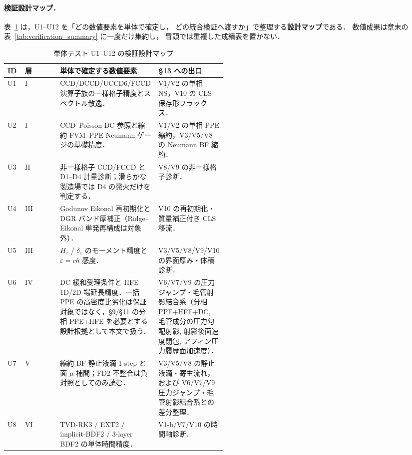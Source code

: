 \paragraph{検証設計マップ．}
表~\ref{tab:U_summary} は，U1--U12 を「どの数値要素を単体で確定し，
どの統合検証へ渡すか」で整理する\textbf{設計マップ}である．
数値成果は章末の表~\ref{tab:verification_summary} に一度だけ集約し，
冒頭では重複した成績表を置かない．

\begin{table}[!ht]
\caption{単体テスト U1--U12 の検証設計マップ}
\label{tab:U_summary}
\centering
\PaperTableDenseSetup
\begin{tabularx}{\linewidth}{@{}>{\raggedright\arraybackslash}p{0.08\linewidth}>{\raggedright\arraybackslash}p{0.16\linewidth}>{\raggedright\arraybackslash}X>{\raggedright\arraybackslash}p{0.27\linewidth}@{}}
\toprule
ID & 層 & 単体で確定する数値要素 & §13 への出口 \\
\midrule
U1 & I & CCD/DCCD/UCCD6/FCCD 演算子族の一様格子精度とスペクトル散逸． & V1/V2 の単相 NS，V10 の CLS 保存形フラックス． \\
U2 & I & CCD--Poisson DC 参照と縮約 FVM--PPE Neumann ゲージの基礎精度． & V1/V2 の単相 PPE 縮約，V3/V5/V8 の Neumann BF 縮約． \\
U3 & II & 非一様格子 CCD/FCCD と D1--D4 計量診断；滑らかな製造場では D4 の発火だけを判定する． & V8/V9 の非一様格子診断． \\
U4 & III & Godunov Eikonal 再初期化と DGR バンド厚補正（Ridge--Eikonal 単発再構成は対象外）． & V10 の再初期化・質量補正付き CLS 移流． \\
U5 & III & $H_\varepsilon$ / $\delta_\varepsilon$ のモーメント精度と $\varepsilon=ch$ 感度． & V3/V5/V8/V9/V10 の界面厚み・体積診断． \\
U6 & IV & DC 緩和受理条件と HFE 1D/2D 場延長精度．一括 PPE の高密度比劣化は保証対象ではなく，§9/§11 の分相 PPE+HFE を必要とする設計根拠として本文で扱う． & V6/V7/V9 の圧力ジャンプ・毛管射影結合系（分相 PPE+HFE+DC, 毛管成分の圧力勾配射影, 射影後面速度閉包, アフィン圧力履歴面加速度）． \\
U7 & V & 縮約 BF 静止液滴 1-step と面 $\mu$ 補間；FD2 不整合は負対照としてのみ読む． & V3/V5/V8 の静止液滴・寄生流れ，および V6/V7/V9 圧力ジャンプ・毛管射影結合系との差分整理． \\
U8 & VI & TVD-RK3 / EXT2 / implicit-BDF2 / 3-layer BDF2 の単体時間精度． & V1-b/V7/V10 の時間軸診断． \\

\end{tabularx}
\end{table}
